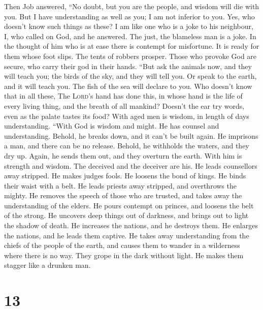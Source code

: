  Then Job answered,  ``No doubt, but you are
the people, and wisdom will die with you.  But I have
understanding as well as you; I am not inferior to you. Yes, who doesn't
know such things as these?  I am like one who is a joke to
his neighbour, I, who called on God, and he answered. The just, the
blameless man is a joke.  In the thought of him who is at
ease there is contempt for misfortune. It is ready for them whose foot
slips.  The tents of robbers prosper. Those who provoke
God are secure, who carry their god in their hands.  ``But
ask the animals now, and they will teach you; the birds of the sky, and
they will tell you.  Or speak to the earth, and it will
teach you. The fish of the sea will declare to you.  Who
doesn't know that in all these, The \textsc{Lord}'s hand has done this,
 in whose hand is the life of every living thing, and the
breath of all mankind?  Doesn't the ear try words, even
as the palate tastes its food?  With aged men is wisdom,
in length of days understanding.  ``With God is wisdom
and might. He has counsel and understanding.  Behold, he
breaks down, and it can't be built again. He imprisons a man, and there
can be no release.  Behold, he withholds the waters, and
they dry up. Again, he sends them out, and they overturn the earth.
 With him is strength and wisdom. The deceived and the
deceiver are his.  He leads counsellors away stripped. He
makes judges fools.  He loosens the bond of kings. He
binds their waist with a belt.  He leads priests away
stripped, and overthrows the mighty.  He removes the
speech of those who are trusted, and takes away the understanding of the
elders.  He pours contempt on princes, and loosens the
belt of the strong.  He uncovers deep things out of
darkness, and brings out to light the shadow of death. 
He increases the nations, and he destroys them. He enlarges the nations,
and he leads them captive.  He takes away understanding
from the chiefs of the people of the earth, and causes them to wander in
a wilderness where there is no way.  They grope in the
dark without light. He makes them stagger like a drunken man.

\hypertarget{section-12}{%
\section{13}\label{section-12}}

